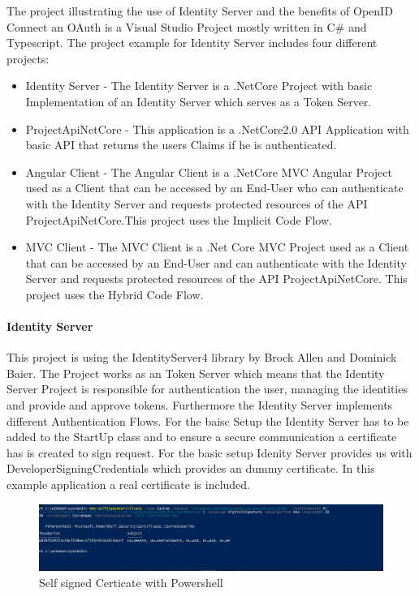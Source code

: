 The project illustrating the use of Identity Server and the benefits of OpenID Connect an OAuth is a Visual Studio Project mostly written in C\# and Typescript. The project example for Identity Server includes four different projects:

\begin{itemize}
	\item Identity Server - The Identity Server is a .NetCore Project with basic Implementation of an Identity Server which serves as a Token Server. 
	\item ProjectApiNetCore - This application is a .NetCore2.0 API Application with basic API that returns the users Claims if he is authenticated.
	\item Angular Client - The Angular Client is a .NetCore MVC Angular Project used as a Client that can be accessed by an End-User who can authenticate with the Identity Server and requests protected resources of the API ProjectApiNetCore.This project uses the Implicit Code Flow. 
	\item MVC Client - The MVC Client is a .Net Core MVC Project used as a Client that can be accessed by an End-User and can authenticate with the Identity Server and requests protected resources of the API ProjectApiNetCore. This project uses the Hybrid Code Flow. 
\end{itemize}



\paragraph{Identity Server}

This project is using the IdentityServer4 library by Brock Allen and Dominick Baier. The Project works as an Token Server which means that the Identity Server Project is responsible for authentication the user, managing the identities and provide and approve tokens. Furthermore the Identity Server implements different Authentication Flows. For the baisc Setup the Identity Server has to be added to the StartUp class and to ensure a secure communication a certificate has is created to sign request. For the basic setup Idenity Server provides us with DeveloperSigningCredentials which provides an dummy certificate. In this example application a real certificate is included. 

\begin{figure}[h]
	\centering
	\includegraphics[width=0.8\linewidth]{images/self-signed-certicate}
	\caption{Self signed Certicate with Powershell}
	\label{fig:self-signed-certicate}
\end{figure}

